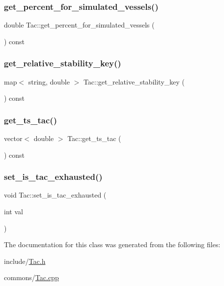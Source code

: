 \subsubsection{\texorpdfstring{get\_percent\_for\_simulated\_vessels()}{get\_percent\_for\_simulated\_vessels()}}
{\footnotesize\ttfamily double Tac\+::get\+\_\+percent\+\_\+for\+\_\+simulated\+\_\+vessels (\begin{DoxyParamCaption}{ }\end{DoxyParamCaption}) const}

\mbox{\label{class_tac_a0cebd3a8dc0b69ff4ab830f7d8d94bff}} 
\subsubsection{\texorpdfstring{get\_relative\_stability\_key()}{get\_relative\_stability\_key()}}
{\footnotesize\ttfamily map$<$ string, double $>$ Tac\+::get\+\_\+relative\+\_\+stability\+\_\+key (\begin{DoxyParamCaption}{ }\end{DoxyParamCaption}) const}

\mbox{\label{class_tac_ae6ddf5154e90a2774b73e1e9fe4daa44}} 
\subsubsection{\texorpdfstring{get\_ts\_tac()}{get\_ts\_tac()}}
{\footnotesize\ttfamily vector$<$ double $>$ Tac\+::get\+\_\+ts\+\_\+tac (\begin{DoxyParamCaption}{ }\end{DoxyParamCaption}) const}

\mbox{\label{class_tac_a68913ab17720a532fd1adca3c4c08ddf}} 
\subsubsection{\texorpdfstring{set\_is\_tac\_exhausted()}{set\_is\_tac\_exhausted()}}
{\footnotesize\ttfamily void Tac\+::set\+\_\+is\+\_\+tac\+\_\+exhausted (\begin{DoxyParamCaption}\item[{int}]{val }\end{DoxyParamCaption})}



The documentation for this class was generated from the following files\+:\begin{DoxyCompactItemize}
\item 
include/\mbox{\hyperlink{_tac_8h}{Tac.\+h}}\item 
commons/\mbox{\hyperlink{_tac_8cpp}{Tac.\+cpp}}\end{DoxyCompactItemize}
